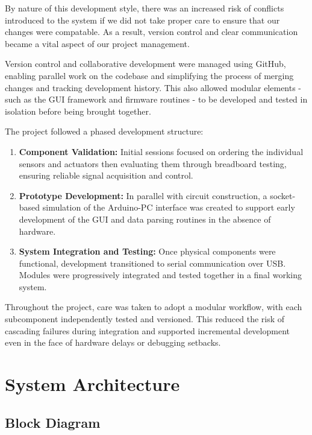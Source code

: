 \documentclass[a4paper,11pt]{article}
\begin{document}
By nature of this development style,
there was an increased risk of conflicts introduced to the system
if we did not take proper care to ensure that our changes were compatable.
As a result, version control and clear communication 
became a vital aspect of our project management.

Version control and collaborative development were managed using GitHub, 
enabling parallel work on the codebase
and simplifying the process of merging changes and tracking development history. 
This also allowed modular elements - 
such as the GUI framework and firmware routines -
to be developed and tested in isolation before being brought together.

The project followed a phased development structure:
\begin{enumerate}[nosep]
    \item \textbf{Component Validation:} 
    Initial sessions focused on ordering the individual sensors 
    and actuators then evaluating them through breadboard testing, 
    ensuring reliable signal acquisition and control.
    \item \textbf{Prototype Development:} 
    In parallel with circuit construction, a socket-based simulation 
    of the Arduino-PC interface was created to support 
    early development of the GUI and data parsing routines 
    in the absence of hardware.
    \item \textbf{System Integration and Testing:} 
    Once physical components were functional, development transitioned 
    to serial communication over USB. 
    Modules were progressively integrated and tested together 
    in a final working system.
\end{enumerate}

Throughout the project, care was taken to adopt a modular workflow, 
with each subcomponent independently tested and versioned. 
This reduced the risk of cascading failures during integration and 
supported incremental development even in the face of hardware delays 
or debugging setbacks.

\section{System Architecture}
\label{sec:architecture}

\subsection{Block Diagram}
\label{sec:block_diagram}
\end{document}
